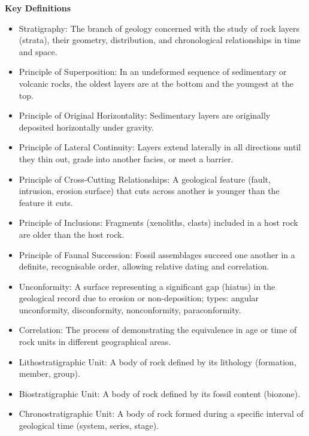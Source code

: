\documentclass[11pt]{article}
\newcommand{\cle}[1]{{\popxbold\color{popdark}#1}}
\begin{document}
\begin{bilan}
\textbf{Key Definitions}
\begin{itemize}
\item \cle{Stratigraphy}: The branch of geology concerned with the study of rock layers (strata), their geometry, distribution, and chronological relationships in time and space.
\item \cle{Principle of Superposition}: In an undeformed sequence of sedimentary or volcanic rocks, the oldest layers are at the bottom and the youngest at the top.
\item \cle{Principle of Original Horizontality}: Sedimentary layers are originally deposited horizontally under gravity.
\item \cle{Principle of Lateral Continuity}: Layers extend laterally in all directions until they thin out, grade into another facies, or meet a barrier.
\item \cle{Principle of Cross-Cutting Relationships}: A geological feature (fault, intrusion, erosion surface) that cuts across another is younger than the feature it cuts.
\item \cle{Principle of Inclusions}: Fragments (xenoliths, clasts) included in a host rock are older than the host rock.
\item \cle{Principle of Faunal Succession}: Fossil assemblages succeed one another in a definite, recognisable order, allowing relative dating and correlation.
\item \cle{Unconformity}: A surface representing a significant gap (hiatus) in the geological record due to erosion or non-deposition; types: angular unconformity, disconformity, nonconformity, paraconformity.
\item \cle{Correlation}: The process of demonstrating the equivalence in age or time of rock units in different geographical areas.
\item \cle{Lithostratigraphic Unit}: A body of rock defined by its lithology (formation, member, group).
\item \cle{Biostratigraphic Unit}: A body of rock defined by its fossil content (biozone).
\item \cle{Chronostratigraphic Unit}: A body of rock formed during a specific interval of geological time (system, series, stage).
\end{itemize}


\end{bilan}
\end{document}
